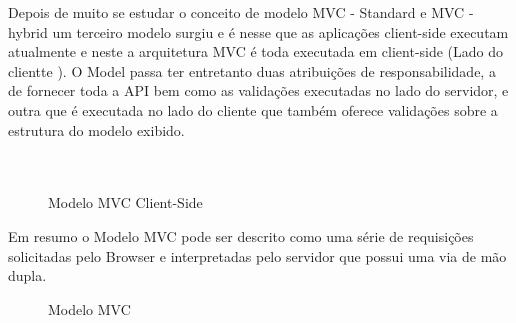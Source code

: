 Depois de muito se estudar o conceito de modelo MVC - Standard e MVC - hybrid um terceiro modelo surgiu e é nesse que as aplicações client-side executam atualmente e neste a arquitetura
MVC é toda executada em client-side (Lado do clientte ). O Model passa ter entretanto duas atribuições de responsabilidade, a de fornecer toda a API bem como as validações executadas no
lado do servidor, e outra que é executada no lado do cliente que também oferece validações sobre a estrutura do modelo exibido.
\\\\\\
\begin{figure}[ht]
    \centering
    \caption{Modelo MVC Client-Side}
    \label{submeter}
\end{figure}

Em resumo o Modelo MVC pode ser descrito como uma série de requisições solicitadas pelo Browser e interpretadas pelo servidor que possui uma via
de mão dupla.

\begin{figure}[ht]
    \centering
    \caption{Modelo MVC}
    \label{submeter}
\end{figure}


